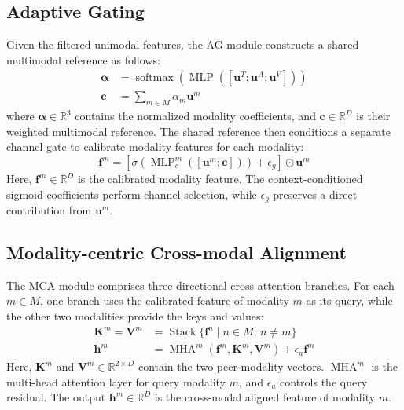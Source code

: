 \documentclass[letterpaper]{article} %
\begin{document}
\subsection{Adaptive Gating}
Given the filtered unimodal features, the AG module constructs a shared multimodal
reference as follows:
\begin{equation}
\begin{aligned}
\boldsymbol{\alpha}
&=\operatorname{softmax}\!\left(
  \operatorname{MLP}([\mathbf{u}^{T};
  \mathbf{u}^{A};\mathbf{u}^{V}])\right)\\
\mathbf{c}
&=\sum_{m\in M}\alpha_m\mathbf{u}^{m}
\end{aligned}
\label{eq:adaptive_context}
\end{equation}
where $\boldsymbol{\alpha}\in\mathbb{R}^{3}$ contains the normalized modality
coefficients, and $\mathbf{c}\in\mathbb{R}^{D}$ is their weighted
multimodal reference. The shared reference then conditions a separate
channel gate to calibrate modality features for each modality:
\begin{equation}
\mathbf{f}^{m}
=\left[
  \sigma\!\left(\operatorname{MLP}_{c}^{m}
  ([\mathbf{u}^{m};\mathbf{c}])\right)+\epsilon_g
  \right]\odot\mathbf{u}^{m}
\label{eq:channel_calibration}
\end{equation}
Here, $\mathbf{f}^{m}\in\mathbb{R}^{D}$ is the calibrated modality
feature. The context-conditioned sigmoid coefficients perform channel
selection, while $\epsilon_g$ preserves a direct contribution from
$\mathbf{u}^{m}$.

\subsection{Modality-centric Cross-modal Alignment}

The MCA module comprises three directional cross-attention branches.
For each $m\in M$, one branch uses the calibrated feature of
modality $m$ as its query, while the other two modalities provide the
keys and values:
\begin{equation}
\begin{aligned}
\mathbf{K}^{m}=\mathbf{V}^{m}
&=\operatorname{Stack}\{\mathbf{f}^{n}
  \mid n\in M,\,n\neq m\}\\
\mathbf{h}^{m}
&=\operatorname{MHA}^{m}
  (\mathbf{f}^{m},\mathbf{K}^{m},\mathbf{V}^{m})
  +\epsilon_a\mathbf{f}^{m}
\end{aligned}
\label{eq:cross_modal_attention}
\end{equation}
Here, $\mathbf{K}^{m}$ and $\mathbf{V}^{m}\in\mathbb{R}^{2\times D}$
contain the two peer-modality vectors.
$\operatorname{MHA}^{m}$ is the multi-head attention layer for query modality
$m$, and $\epsilon_a$ controls the query residual. The output
$\mathbf{h}^{m}\in\mathbb{R}^{D}$ is the cross-modal aligned feature of
modality $m$. %
\end{document}
